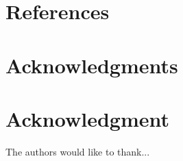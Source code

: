 \documentclass[10pt,journal,compsoc]{IEEEtran}
\begin{document}
\section{References}


%


\appendices
\ifCLASSOPTIONcompsoc
  \section*{Acknowledgments}
\else
  \section*{Acknowledgment}
\fi


The authors would like to thank...


\ifCLASSOPTIONcaptionsoff
  \newpage
\fi



\end{document}
